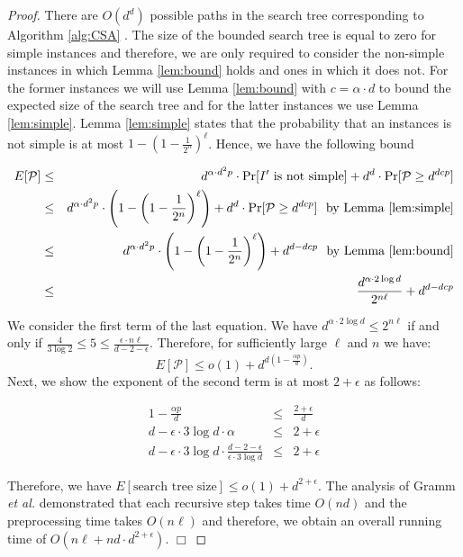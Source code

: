\begin{proof} There are $O(d^d)$ possible paths in the search tree corresponding to Algorithm \ref{alg:CSA} \cite{GNR03}. The size of the bounded search tree is equal to zero for simple instances and   therefore, we are only required to consider the non-simple instances in which Lemma \ref{lem:bound} holds and ones in which it does not.  For the former instances we will use Lemma \ref{lem:bound} with $c = \alpha \cdot d$ to bound the expected size of the search tree and for the latter instances we use Lemma \ref{lem:simple}.  Lemma \ref{lem:simple} states that the probability that an instances is not simple is at most  $1 - \left( 1  - \frac{1}{2^n}\right)^{\ell}$.  Hence, we have the following bound

\begin{eqnarray*}
E[\mathcal{P}] & \leq & d^{\alpha \cdot d^2p} \cdot \Pr[I' \mbox{ is not simple}] + d^d \cdot\Pr[\mathcal{P} \geq d^{dcp}] \\
 								& \leq & d^{\alpha \cdot d^2p} \cdot \left( 1 - \left( 1  - \frac{1}{2^n}\right)^{\ell} \right) +d^d \cdot\Pr[\mathcal{P} \geq d^{dcp}]  \, \, \mbox{ by Lemma \ref{lem:simple}}\\
 											& \leq & d^{\alpha \cdot d^2p} \cdot \left( 1 - \left( 1  - \frac{1}{2^n}\right)^{\ell} \right) + d^{d - dcp}   \, \, \mbox{ by Lemma \ref{lem:bound}}\\
 											& \leq & \frac{d^{\alpha \cdot 2 \log d}} {2^{n\ell}} + d^{d - dcp} \\
\end{eqnarray*}  

We consider the first term of the last equation.  We have $d^{ \alpha \cdot 2 \log d} \leq 2^{n \ell}$ if and only if $\frac{4}{3 \log 2} \leq 5 \leq \frac{\epsilon \cdot n \ell}{d - 2 - \epsilon}$.  Therefore, for sufficiently large $\ell$ and $n$ we have: $$ E[\mathcal{P}] \leq  o(1) +  d^{d(1 -\frac{\alpha p}{d})}.$$ Next, we show the exponent of the second term is at most $2 + \epsilon$ as follows:

\begin{eqnarray*}
1 - \frac{\alpha p}{d}  & \leq & \frac{2 + \epsilon}{d} \\
d - \epsilon \cdot 3 \log d \cdot \alpha & \leq & 2 + \epsilon \\
d - \epsilon \cdot 3 \log d \cdot \frac{d - 2 - \epsilon}{\epsilon \cdot 3 \log d} & \leq & 2 + \epsilon 
\end{eqnarray*}  

Therefore, we have $E[\mbox{search tree size}] \leq o(1) +  d^{2 + \epsilon}$. The analysis of Gramm {\em et al.} \cite{GNR03} demonstrated that each recursive step takes time $O(nd)$ and the preprocessing time takes $O(n\ell)$ and therefore, we obtain an overall running time of $O(n \ell + n d \cdot d^{2 + \epsilon})$. \hfill $\Box$ \end{proof}

